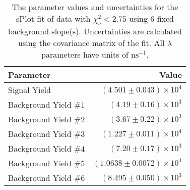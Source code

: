 
\begin{table}
    \begin{center}
        \begin{tabular}{lr}\toprule
            Parameter & Value \\\midrule
            Signal Yield & $(4.501 \pm 0.043) \times 10^{4}$ \\
            Background Yield $\#1$ & $(4.19 \pm 0.16) \times 10^{3}$ \\
            Background Yield $\#2$ & $(3.67 \pm 0.22) \times 10^{3}$ \\
            Background Yield $\#3$ & $(1.227 \pm 0.011) \times 10^{4}$ \\
            Background Yield $\#4$ & $(7.20 \pm 0.17) \times 10^{3}$ \\
            Background Yield $\#5$ & $(1.0638 \pm 0.0072) \times 10^{4}$ \\
            Background Yield $\#6$ & $(8.495 \pm 0.050) \times 10^{3}$ \\\bottomrule
        \end{tabular}
        \caption{The parameter values and uncertainties for the sPlot fit of data with $\chi^2_\nu < 2.75$ using 6 fixed background slope(s). Uncertainties are calculated using the covariance matrix of the fit. All $\lambda$ parameters have units of $\si{\nano\second}^{-1}$.}
    \end{center}
\end{table}
